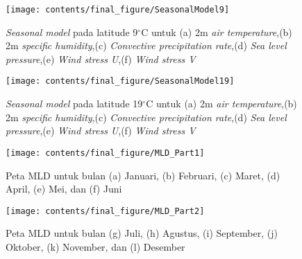 \begin{figure}[H]
	\centering
	\texttt{[image: contents/final\_figure/SeasonalModel9]}
	\caption{\textit{Seasonal model} pada latitude 9$^\circ$C untuk (a) 2m \textit{air temperature},(b) 2m \textit{specific humidity},(c) \textit{Convective precipitation rate},(d) \textit{Sea level pressure},(e) \textit{Wind stress U},(f) \textit{Wind stress V}}
	\label{fig:SM9}
\end{figure}

\begin{figure}[H]
	\centering
	\texttt{[image: contents/final\_figure/SeasonalModel19]}
	\caption{\textit{Seasonal model} pada latitude 19$^\circ$C untuk (a) 2m \textit{air temperature},(b) 2m \textit{specific humidity},(c) \textit{Convective precipitation rate},(d) \textit{Sea level pressure},(e) \textit{Wind stress U},(f) \textit{Wind stress V}}
	\label{fig:SM19}
\end{figure}

\begin{figure}[H]
	\centering
	\texttt{[image: contents/final\_figure/MLD\_Part1]}
	\caption{Peta MLD untuk bulan (a) Januari, (b) Februari, (c) Maret, (d) April, (e) Mei, dan (f) Juni}
	\label{fig:MLD_part1}
\end{figure}

\begin{figure}[H]
	\centering
	\texttt{[image: contents/final\_figure/MLD\_Part2]}
	\caption{Peta MLD untuk bulan (g) Juli, (h) Agustus, (i) September, (j) Oktober, (k) November, dan (l) Desember}
	\label{fig:MLD_part2}
\end{figure}